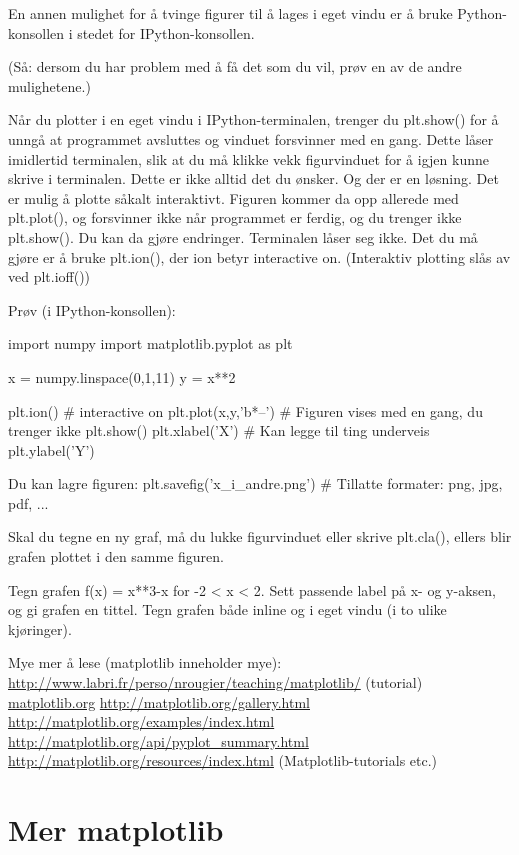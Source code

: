 En annen mulighet for å tvinge figurer til å lages i eget vindu er å bruke Python-konsollen i stedet for IPython-konsollen. 

(Så: dersom du har problem med å få det som du vil, prøv en av de andre mulighetene.) 

Når du plotter i en eget vindu i IPython-terminalen, trenger du plt.show() for å unngå at programmet avsluttes og vinduet forsvinner med en gang. Dette låser imidlertid terminalen, slik at du må klikke vekk figurvinduet for å igjen kunne skrive i terminalen. Dette er ikke alltid det du ønsker. Og der er en løsning. Det er mulig å plotte såkalt interaktivt. Figuren kommer da opp allerede med plt.plot(), og forsvinner ikke når programmet er ferdig, og du trenger ikke plt.show(). Du kan da gjøre endringer. Terminalen låser seg ikke. Det du må gjøre er å bruke plt.ion(), der ion betyr interactive on. (Interaktiv plotting slås av ved plt.ioff()) 

Prøv (i IPython-konsollen):
\begin{usncodebox}
import numpy 
import matplotlib.pyplot as plt 

x = numpy.linspace(0,1,11)
y = x**2

plt.ion()              # interactive on 
plt.plot(x,y,'b*--')   # Figuren vises med en gang, du trenger ikke plt.show()
plt.xlabel('X')        # Kan legge til ting underveis
plt.ylabel('Y') 

Du kan lagre figuren: 
plt.savefig('x_i_andre.png')   # Tillatte formater: png, jpg, pdf, ... 
\end{usncodebox}

Skal du tegne en ny graf, må du lukke figurvinduet eller skrive plt.cla(), ellers blir grafen plottet i den samme figuren. 

\begin{question}
Tegn grafen f(x) = x**3-x for -2 < x < 2. Sett passende label på x- og y-aksen, og gi grafen en tittel. Tegn grafen både inline og i eget vindu (i to ulike kjøringer). 
\end{question}

Mye mer å lese (matplotlib inneholder mye): 
\url{http://www.labri.fr/perso/nrougier/teaching/matplotlib/}  (tutorial) 
\url{matplotlib.org}
\url{http://matplotlib.org/gallery.html} 
\url{http://matplotlib.org/examples/index.html}
\url{http://matplotlib.org/api/pyplot_summary.html}
\url{http://matplotlib.org/resources/index.html}  (Matplotlib-tutorials etc.)

\section{Mer matplotlib}

